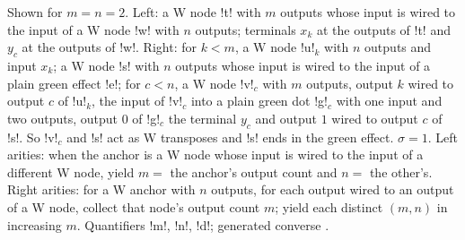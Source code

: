 Shown for $m=n=2$. Left: a W node \code!t! with $m$ outputs whose input is wired to the input of a
W node \code!w! with $n$ outputs; terminals $x_k$ at the outputs of \code!t! and $y_c$ at the
outputs of \code!w!. Right: for $k<m$, a W node \code!u!$_k$ with $n$ outputs and input $x_k$; a W
node \code!s! with $n$ outputs whose input is wired to the input of a plain green effect \code!e!;
for $c<n$, a W node \code!v!$_c$ with $m$ outputs, output $k$ wired to output $c$ of
\code!u!$_k$, the input of \code!v!$_c$ into a plain green dot \code!g!$_c$ with one input and two
outputs, output $0$ of \code!g!$_c$ the terminal $y_c$ and output $1$ wired to output $c$ of
\code!s!. So \code!v!$_c$ and \code!s! act as W transposes and \code!s! ends in the green effect.
$\sigma=1$. Left arities: when the anchor is a W node whose input is wired to the input of a
different W node, yield $m=$ the anchor's output count and $n=$ the other's. Right arities: for a W
anchor with $n$ outputs, for each output wired to an output of a W node, collect that node's output
count $m$; yield each distinct $(m,n)$ in increasing $m$. Quantifiers \code!m!, \code!n!, \code!d!;
generated converse .

